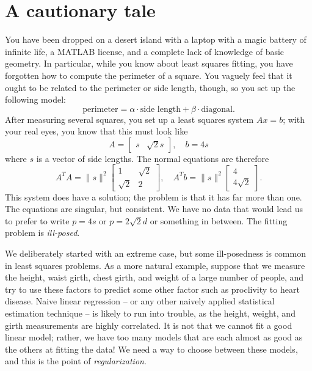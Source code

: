 \documentclass[12pt, leqno]{article}
\begin{document}

\section{A cautionary tale}


You have been dropped on a desert island with a laptop with a magic
battery of infinite life, a MATLAB license, and a complete lack of
knowledge of basic geometry.  In particular, while you know about
least squares fitting, you have forgotten how to compute the perimeter
of a square.  You vaguely feel that it ought to be related to the
perimeter or side length, though, so you set up the following model:
\[
  \mbox{perimeter} = \alpha \cdot \mbox{side length} + \beta \cdot \mbox{diagonal}.
\]
After measuring several squares, you set up a least squares system
$Ax = b$; with your real eyes, you know that this must look
like
\[
  A = \begin{bmatrix} s & \sqrt{2} s \end{bmatrix}, \quad
  b = 4 s
\]
where $s$ is a vector of side lengths.  The normal equations are
therefore
\[
A^T A = \|s\|^2
\begin{bmatrix} 1 & \sqrt{2} \\ \sqrt{2} & 2 \end{bmatrix}, \quad
A^T b = \|s\|^2
\begin{bmatrix} 4 \\ 4 \sqrt{2} \end{bmatrix}.
\]
This system does have a solution; the problem is that it has far more
than one.  The equations are singular, but consistent.
We have no data that would lead us to prefer to write
$p = 4s$ or $p = 2 \sqrt{2} d$ or something in between.
The fitting problem is {\em ill-posed}.

We deliberately started with an extreme case, but some ill-posedness
is common in least squares problems.  As a more natural example,
suppose that we measure the height, waist girth, chest girth, and
weight of a large number of people, and try to use these factors to
predict some other factor such as proclivity to heart disease.  Naive
linear regression -- or any other naively applied statistical
estimation technique -- is likely to run into trouble, as the height,
weight, and girth measurements are highly correlated.  It is not that
we cannot fit a good linear model; rather, we have too many models
that are each almost as good as the others at fitting the data!  We
need a way to choose between these models, and this is the point of
{\em regularization}.
\end{document}
